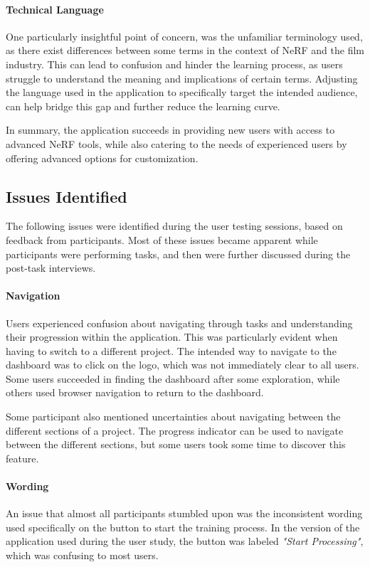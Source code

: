 \paragraph{Technical Language}
One particularly insightful point of concern, was the unfamiliar terminology used, as there exist differences between some terms in the context of NeRF and the film industry.
This can lead to confusion and hinder the learning process, as users struggle to understand the meaning and implications of certain terms.
Adjusting the language used in the application to specifically target the intended audience, can help bridge this gap and further reduce the learning curve.

In summary, the application succeeds in providing new users with access to advanced NeRF tools, while also catering to the needs of experienced users by offering advanced options for customization.

\subsection*{Issues Identified}
\label{sec:results:issues_identified}

The following issues were identified during the user testing sessions, based on feedback from participants. 
Most of these issues became apparent while participants were performing tasks, and then were further discussed during the post-task interviews.

\paragraph{Navigation}
Users experienced confusion about navigating through tasks and understanding their progression within the application.
This was particularly evident when having to switch to a different project.
The intended way to navigate to the dashboard was to click on the logo, which was not immediately clear to all users.
Some users succeeded in finding the dashboard after some exploration, while others used browser navigation to return to the dashboard.

Some participant also mentioned uncertainties about navigating between the different sections of a project.
The progress indicator can be used to navigate between the different sections, but some users took some time to discover this feature.

\paragraph{Wording}
An issue that almost all participants stumbled upon was the inconsistent wording used specifically on the button to start the training process.
In the version of the application used during the user study, the button was labeled \emph{"Start Processing"}, which was confusing to most users.


